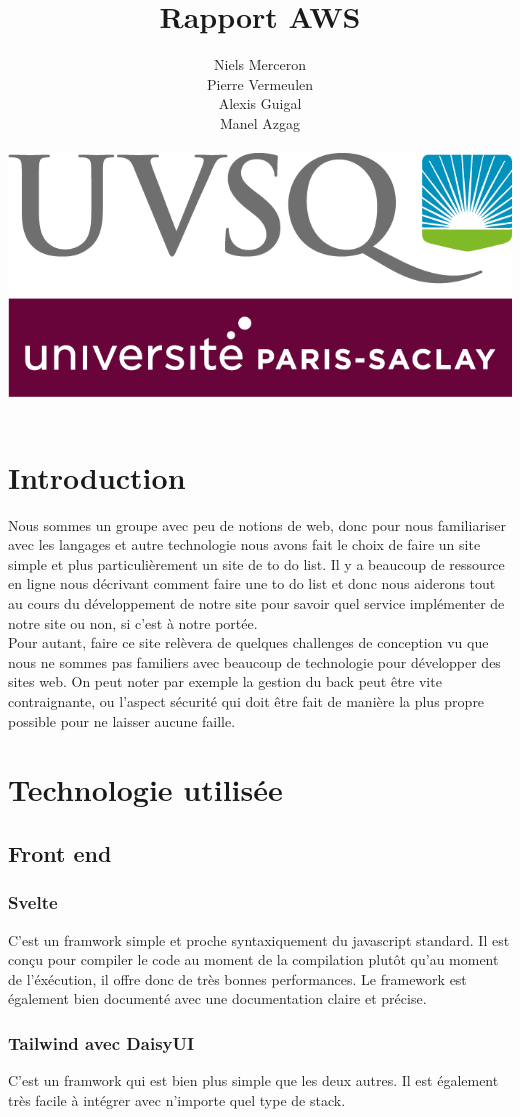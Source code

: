 \documentclass[a4paper,12pt]{report}
\date{}
\title{Rapport AWS}
\author{Niels Merceron \\ Pierre Vermeulen \\ Alexis Guigal \\ Manel Azgag \\ \\  \includegraphics[scale=0.20]{logo-UVSQ-2020-RVB.png}}
\begin{document}
\maketitle

\newpage
\tableofcontents
\chapter{Introduction}

Nous sommes un groupe avec peu de notions de web, donc pour nous familiariser avec les langages et autre technologie nous avons fait le choix de faire un site simple et plus particulièrement un site de to do list. Il y a beaucoup de ressource en ligne nous décrivant comment faire une to do list et donc nous aiderons tout au cours du développement de notre site pour savoir quel service implémenter de notre site ou non, si c'est à notre portée.
\\Pour autant, faire ce site relèvera de quelques challenges de conception vu que nous ne sommes pas familiers avec beaucoup de technologie pour développer des sites web.
On peut noter par exemple la gestion du back peut être vite contraignante, ou l'aspect sécurité qui doit être fait de manière la plus propre possible pour ne laisser aucune faille.


\chapter{Technologie utilisée}
\section{Front end}

\subsection{Svelte}
C'est un framwork simple et proche syntaxiquement du javascript standard. Il est conçu pour compiler le code au moment de la compilation plutôt qu'au moment de l'éxécution, il offre donc de très bonnes performances. Le framework est également bien documenté avec une documentation claire et précise.

\subsection{Tailwind avec DaisyUI}
C'est un framwork qui est bien plus simple que les deux autres. Il est également très facile à intégrer avec n'importe quel type de stack.
\end{document}
